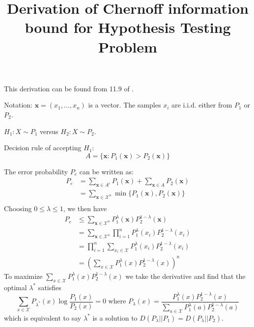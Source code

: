 \documentclass{article}
\title{Derivation of Chernoff information bound for Hypothesis Testing Problem}
\begin{document}
\maketitle
This derivation can be found from 11.9 of \cite{it}.

Notation: $\bm{x} = (x_1, \dots, x_n)$ is a vector. The samples $x_i$ are i.i.d. either from $P_1$ or $P_2$.

$ H_1: X \sim P_1 $ versus $ H_2:  X \sim P_2 $.

Decision rule of accepting $H_1$:
\begin{equation}
A=\{\bm{x}: P_1(\bm{x}) > P_2(\bm{x})\}
\end{equation}

The error probability $P_e$ can be written as:
\begin{align*}
P_e & = \sum_{\bm{x} \in A^c} P_1(\bm{x})
+ \sum_{\bm{x} \in A} P_2(\bm{x}) \\
& = \sum_{\bm{x} \in \mathcal{X}^n} \min \{ P_1(\bm{x}), P_2(\bm{x})\} \\
\end{align*}
Choosing $ 0 \leq \lambda \leq 1 $,
we then have
\begin{align*}
P_e & \leq \sum_{\bm{x} \in \mathcal{X}^n}  P_1^{\lambda}(\bm{x})  P_2^{1-\lambda}(\bm{x}) \\
& =  \sum_{\bm{x} \in \mathcal{X}^n}  \prod_{i=1}^n P_1^{\lambda}(x_i)  P_2^{1-\lambda}(x_i) \\
& = \prod_{i=1}^n \sum_{x_i\in \mathcal{X}} P_1^{\lambda}(x_i)  P_2^{1-\lambda}(x_i) \\
& = \left(\sum_{x\in \mathcal{X}} P_1^{\lambda}(x)  P_2^{1-\lambda}(x)\right)^n
\end{align*}
To maximize $\sum_{x\in \mathcal{X}} P_1^{\lambda}(x)  P_2^{1-\lambda}(x)$ we take the derivative
and find that the optimal $\lambda^*$ satisfies
\begin{equation}
\sum_{x\in \mathcal{X}} P_{\lambda^*}(x) \log \frac{P_1(x)}{P_2(x)} = 0 \textrm{ where }
P_{\lambda}(x) = \frac{P_1^{\lambda}(x)P_2^{1-\lambda}(x)}{\sum_{a\in \mathcal{X}}P_1^{\lambda}(a)P_2^{1-\lambda}(a)}
\end{equation}
which is equivalent to say $\lambda^*$ is a solution to $D(P_{\lambda}|| P_1) = D(P_{\lambda} || P_2)$.
\end{document}
